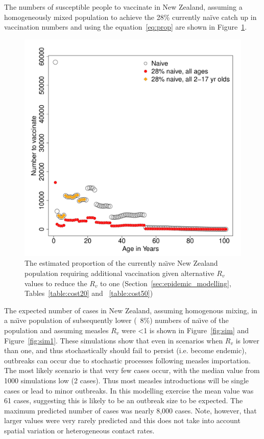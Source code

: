 \documentclass{article}
\begin{document}
\begin{itemize}
The numbers of susceptible people to vaccinate in New Zealand, assuming a homogeneously mixed population to achieve the 28\% currently na\"{i}ve catch up in vaccination numbers and using the equation~\ref{eq:prop} are shown in Figure~\ref{fig:numvac}.


\begin{figure}[width=1\textwidth]
     \centering
\includegraphics{draftfinalreport-061}
     \caption{The estimated proportion of the currently na\"{\i}ve New Zealand population requiring additional vaccination given alternative $R_v$ values to reduce the $R_v$ to one (Section~\ref{sec:epidemic_modelling}, Tables~\ref{table:cost20} and ~\ref{table:cost50})}
     \label{fig:numvac}
\end{figure}

The expected number of cases in New Zealand, assuming homogenous mixing, in a na\"{\i}ve population of subsequently lower (~8\%) numbers of na\"{\i}ve of the population and assuming measles $R_v$ were <1 is shown in Figure~\ref{fig:sim} and Figure~\ref{fig:sim1}. These simulations show that even in scenarios when $R_v$ is lower than one, and thus stochastically should fail to persist (i.e. become endemic), outbreaks can occur due to stochastic processes following measles importation. The most likely scenario is that very few cases occur, with the median value from 1000 simulations low (2 cases). Thus most measles introductions will be single cases or lead to minor outbreaks. In this modelling exercise the mean value was 61 cases, suggesting this is likely to be an outbreak size to be expected. The maximum predicted number of cases was nearly 8,000 cases. Note, however, that larger values were very rarely predicted and this does not take into account spatial variation or heterogeneous contact rates.



\end{itemize}
\end{document}
